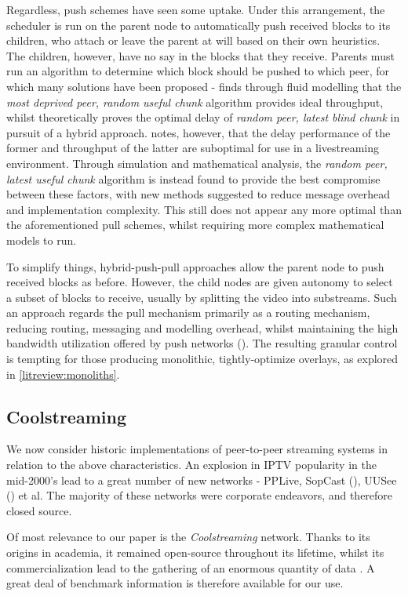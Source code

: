 \documentclass[12pt,a4paper]{article}
\begin{document}
Regardless, push schemes have seen some uptake. Under this arrangement, the scheduler is run on the parent node to automatically push received blocks to its children, who attach or leave the parent at will based on their own heuristics. The children, however, have no say in the blocks that they receive. Parents must run an algorithm to determine which block should be pushed to which peer, for which many solutions have been proposed - \cite{Massoulie2007} finds through fluid modelling that the \textit{most deprived peer, random useful chunk} algorithm provides ideal throughput, whilst \cite{Sanghavi2006} theoretically proves the optimal delay of \textit{random peer, latest blind chunk} in pursuit of a hybrid approach. \cite{Bonald2008} notes, however, that the delay performance of the former and throughput of the latter are suboptimal for use in a livestreaming environment. Through simulation and mathematical analysis, the \textit{random peer, latest useful chunk} algorithm is instead found to provide the best compromise between these factors, with new methods suggested to reduce message overhead and implementation complexity. This still does not appear any more optimal than the aforementioned pull schemes, whilst requiring more complex mathematical models to run.

To simplify things, hybrid-push-pull approaches allow the parent node to push received blocks as before. However, the child nodes are given autonomy to select a subset of blocks to receive, usually by splitting the video into substreams. Such an approach regards the pull mechanism primarily as a routing mechanism, reducing routing, messaging and modelling overhead, whilst maintaining the high bandwidth utilization offered by push networks (\cite{Zhang2007}). The resulting granular control is tempting for those producing monolithic, tightly-optimize overlays, as explored in \ref{litreview:monoliths}.

\subsection{Coolstreaming} \label{litreview:coolstreaming}
We now consider historic implementations of peer-to-peer streaming systems in relation to the above characteristics. An explosion in IPTV popularity in the mid-2000's lead to a great number of new networks - PPLive, SopCast (\cite{SopCast2019}), UUSee (\cite{UUSee2007}) et al. The majority of these networks were corporate endeavors, and therefore closed source.

Of most relevance to our paper is the \textit{Coolstreaming} network. Thanks to its origins in academia, it remained open-source throughout its lifetime, whilst its commercialization lead to the gathering of an enormous quantity of data \cite{Li2007}. A great deal of benchmark information is therefore available for our use.
\end{document}
